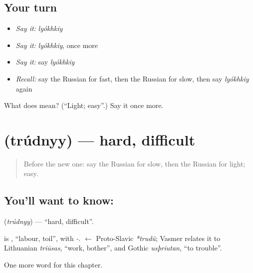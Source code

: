 \subsection*{Your turn}
\begin{itemize}
\raggedright
  \item \emph{Say it:} \emph{lyókhkiy}
  \item \emph{Say it:} \emph{lyókhkiy}, once more
  \item \emph{Say it:} say \emph{lyókhkiy}
  \item \emph{Recall:} say the Russian for fast, then the Russian for slow, then say \emph{lyókhkiy} again
\end{itemize}

\begin{tcolorbox}[breakable,colback=teal!4,colframe=teal!35!black,title={Before you move on}]
What does  mean? (\textquotedblleft{}Light; easy\textquotedblright{}.) Say it once more.
\end{tcolorbox}
\section[\texorpdfstring{\ru{трудный} (trúdnyy)}{трудный (trúdnyy)}]{ (trúdnyy) — hard, difficult}

\label{lesson:RU-C67-hard}



\begin{quote}
Before the new one: say the Russian for slow, then the Russian for light; easy.
\end{quote}

\subsection*{You'll want to know: }
\textbf{} (\emph{trúdnyy}) — \textquotedblleft{}hard, difficult\textquotedblright{}.

\begin{cousinweb}
\textbf{} is \emph{}, \textquotedblleft{}labour, toil\textquotedblright{}, with \emph{-}. \emph{} $\leftarrow$ Proto-Slavic \emph{*trudŭ}; Vasmer relates it to Lithuanian \emph{triūsas}, \textquotedblleft{}work, bother\textquotedblright{}, and Gothic \emph{usþriutan}, \textquotedblleft{}to trouble\textquotedblright{}.
\end{cousinweb}

\begin{grammarlens}[title={What you've built}]
One more word for this chapter.
\end{grammarlens}

